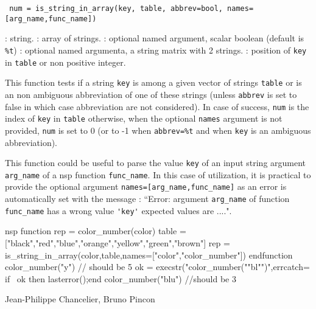 
\begin{mandesc}
\end{mandesc}
\begin{calling_sequence}
\begin{verbatim}
 num = is_string_in_array(key, table, abbrev=bool, names=[arg_name,func_name])  
\end{verbatim}
\end{calling_sequence}
\begin{parameters}
  \begin{varlist}
    : string.
    : array of strings.
    : optional named argument, scalar boolean (default is \verb+%t+)
    : optional named argumenta, a string matrix with 2 strings.
    : position of \verb+key+ in \verb+table+ or non positive integer.
  \end{varlist}
\end{parameters}
\begin{mandescription}
  This function tests if a string \verb+key+ is among a given vector of strings \verb+table+
 or is an non ambiguous abbreviation of one of these strings (unless \verb+abbrev+ 
 is set to false in which case abbreviation are not considered). In case of success, 
 \verb+num+ is the index of \verb+key+ in  \verb+table+ otherwise, when the optional
 \verb+names+ argument is not provided, \verb+num+ is set to 0 
 (or to -1 when \verb+abbrev=%t+ and when \verb+key+ is an ambiguous abbreviation).
 
  This function could be useful to parse the value \verb+key+ of an input string argument 
 \verb+arg_name+ of a nsp function  \verb+func_name+. In this case of utilization, it is
 practical to provide the optional argument \verb+names=[arg_name,func_name]+ as an error 
 is automatically set with the message : ``Error:  argument \verb+arg_name+ of function  
\verb+func_name+  has a wrong value \verb+'key'+ expected values are ....".

\end{mandescription}
\begin{examples}
\begin{mintednsp}{nsp}
function rep = color_number(color)
   table = ["black","red","blue","orange","yellow","green","brown"]
   rep = is_string_in_array(color,table,names=["color","color_number"])
endfunction
color_number("y") // should be 5
ok = execstr("color_number(""bl"")",errcatch=%
if ~ok then lasterror();end
color_number("blu") //should be 3
\end{mintednsp}
\end{examples}

\begin{manseealso}
\end{manseealso}

\begin{authors}
  Jean-Philippe Chancelier, Bruno Pincon
\end{authors}


